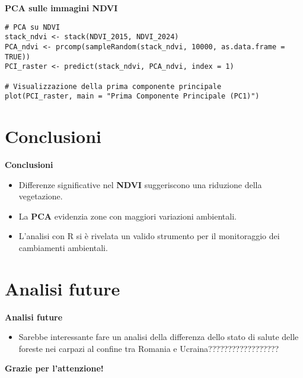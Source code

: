 \documentclass{beamer}
\begin{document}
\begin{frame}[fragile]{\textbf{PCA sulle immagini NDVI}}
\begin{lstlisting}
# PCA su NDVI
stack_ndvi <- stack(NDVI_2015, NDVI_2024)
PCA_ndvi <- prcomp(sampleRandom(stack_ndvi, 10000, as.data.frame = TRUE))
PCI_raster <- predict(stack_ndvi, PCA_ndvi, index = 1)

# Visualizzazione della prima componente principale
plot(PCI_raster, main = "Prima Componente Principale (PC1)")
\end{lstlisting}
\end{frame}

\section{Conclusioni}

\begin{frame}{\textbf{Conclusioni}}
\begin{itemize}
    \item Differenze significative nel \textbf{NDVI} suggeriscono una riduzione della vegetazione.
    \item La \textbf{PCA} evidenzia zone con maggiori variazioni ambientali.
    \item L'analisi con R si è rivelata un valido strumento per il monitoraggio dei cambiamenti ambientali.
\end{itemize}
\end{frame}

\section{Analisi future}

\begin{frame}{\textbf{Analisi future}}
\begin{itemize}
    \item Sarebbe interessante fare un analisi della differenza dello stato di salute delle foreste nei carpazi al confine tra Romania e Ucraina??????????????????
  
\end{itemize}
\end{frame}


\begin{frame}{}
\centering
\textbf{Grazie per l'attenzione!}
\end{frame}
\end{document}
